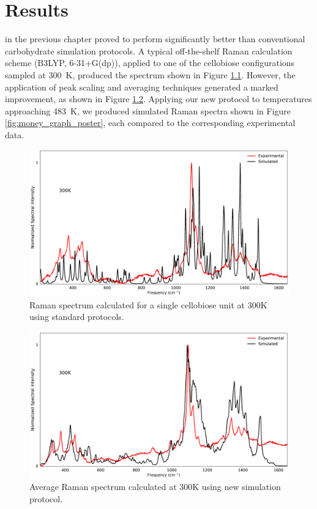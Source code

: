 \chapter{Results}

 in the previous chapter proved to perform significantly better than conventional carbohydrate simulation protocols. A typical off-the-shelf Raman calculation scheme (B3LYP, 6-31+G(dp)), applied to one of the cellobiose configurations sampled at \SI{300}{K}, produced the spectrum shown in Figure \ref{fig:single_gdp}. However, the application of peak scaling and averaging techniques generated a marked improvement, as shown in Figure \ref{fig:money_single}. Applying our new protocol to temperatures approaching \SI{483}{K}, we produced simulated Raman spectra shown in Figure \ref{fig:money_graph_poster}, each compared to the corresponding experimental data.
\begin{figure}
\centering
\includegraphics[width=\linewidth]{single_gdp}
\caption{Raman spectrum calculated for a single cellobiose unit at 300K using standard protocols.}
\label{fig:single_gdp}
\end{figure}
\begin{figure}
\centering
\includegraphics[width=\linewidth]{money_single}
\caption{Average Raman spectrum calculated at 300K using new simulation protocol.}
\label{fig:money_single}
\end{figure}


